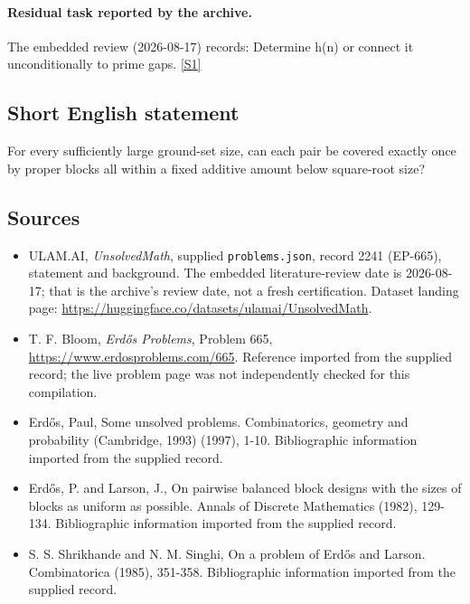 \documentclass[11pt,a4paper]{article}
\newcommand{\sref}[2]{\hyperlink{source:#1:#2}{[S#2]}}
\begin{document}
\paragraph{Residual task reported by the archive.}

The embedded review (2026-08-17) records: Determine h(n) or connect it unconditionally to prime gaps. \sref{2241}{1}

\subsection{Short English statement}

For every sufficiently large ground-set size, can each pair be covered exactly once by proper blocks all within a fixed additive amount below square-root size?

\subsection{Sources}

{\small

\begin{itemize}

\item[\hypertarget{source:2241:1}{S1}] ULAM.AI, \emph{UnsolvedMath}, supplied \texttt{problems.json}, record 2241 (EP-665), statement and background. The embedded literature-review date is 2026-08-17; that is the archive’s review date, not a fresh certification. Dataset landing page: \url{https://huggingface.co/datasets/ulamai/UnsolvedMath}.

\item[\hypertarget{source:2241:2}{S2}] T. F. Bloom, \emph{Erdős Problems}, Problem 665, \url{https://www.erdosproblems.com/665}. Reference imported from the supplied record; the live problem page was not independently checked for this compilation.

\item[\hypertarget{source:2241:3}{S3}] Erd\H{o}s, Paul, Some unsolved problems. Combinatorics, geometry and probability (Cambridge, 1993) (1997), 1-10. Bibliographic information imported from the supplied record.

\item[\hypertarget{source:2241:4}{S4}] Erd\H{o}s, P. and Larson, J., On pairwise balanced block designs with the sizes of blocks as uniform as possible. Annals of Discrete Mathematics (1982), 129-134. Bibliographic information imported from the supplied record.

\item[\hypertarget{source:2241:5}{S5}] S. S. Shrikhande and N. M. Singhi, On a problem of Erd\H{o}s and Larson. Combinatorica (1985), 351-358. Bibliographic information imported from the supplied record.

\end{itemize}

}

\label{end:2241}
\end{document}
